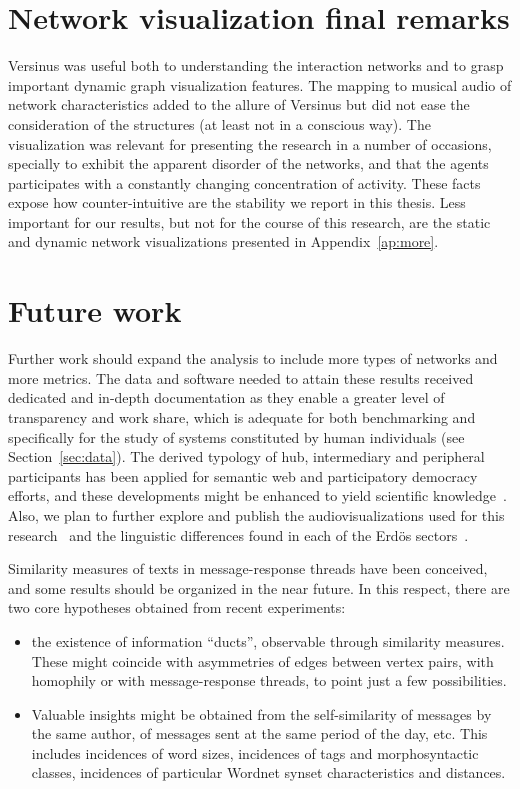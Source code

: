 \section{Network visualization final remarks}
Versinus was useful both to understanding the interaction networks and to
grasp important dynamic graph visualization features.
The mapping to musical audio of network characteristics added to
the allure of Versinus but did not ease the consideration of the structures
(at least not in a conscious way).
The visualization was relevant for presenting the research in a number of occasions,
specially to exhibit the apparent disorder of the networks,
and that the agents participates with a constantly changing concentration of activity.
These facts expose how counter-intuitive are the stability we report in this thesis.
Less important for our results, but not for the course of this research,
are the static and dynamic network visualizations presented in Appendix~\ref{ap:more}.

\section{Future work}\label{sec:fw}

Further work should expand the analysis to include
more types of networks and more metrics.
The data and software needed to attain these results
received dedicated and in-depth
documentation as they enable a greater level of transparency
and work share,
which is adequate for both benchmarking
and specifically for the study of systems constituted
by human individuals (see Section~\ref{sec:data}).
The derived typology of hub, intermediary and peripheral participants
has been applied for semantic web and participatory democracy efforts,
and these developments might be enhanced to yield scientific knowledge~\cite{pnud4,opa,losd}.
Also, we plan to further explore and publish the audiovisualizations
used for this research~\cite{versinus,animacoes} and
the linguistic differences found in each of the Erd\"os sectors~\cite{rcText}.

Similarity measures of texts in message-response threads have been conceived, 
and some results should be organized in the near future.
In this respect, there are two core hypotheses obtained from recent experiments:
\begin{itemize}
\item the existence of information ``ducts'', observable through similarity measures.
These might coincide with asymmetries of edges between vertex pairs,
with homophily or with message-response threads, to point just a few possibilities.
\item Valuable insights might be obtained from the self-similarity of messages by the same author,
of messages sent at the same period of the day, etc.
This includes incidences of word sizes, incidences of tags and morphosyntactic classes,
incidences of particular Wordnet synset characteristics and distances.
\end{itemize}

